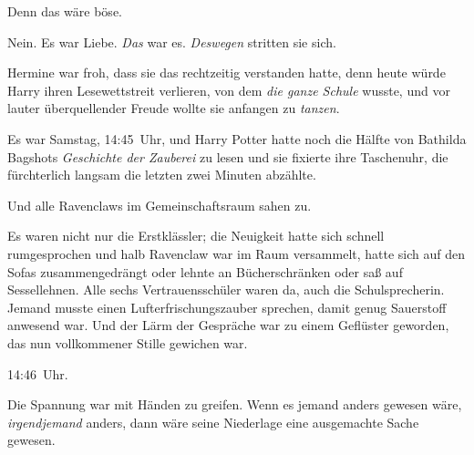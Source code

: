 Denn das wäre böse.

Nein. Es war Liebe. \emph{Das} war es. \emph{Deswegen} stritten sie sich.

Hermine war froh, dass sie das rechtzeitig verstanden hatte, denn heute würde Harry ihren Lesewettstreit verlieren, von dem \emph{die ganze Schule} wusste, und vor lauter überquellender Freude wollte sie anfangen zu \emph{tanzen}.

Es war Samstag, 14:45~Uhr, und Harry Potter hatte noch die Hälfte von Bathilda Bagshots \emph{Geschichte der Zauberei} zu lesen und sie fixierte ihre Taschenuhr, die fürchterlich langsam die letzten zwei Minuten abzählte.

Und alle Ravenclaws im Gemeinschaftsraum sahen zu.

Es waren nicht nur die Erstklässler; die Neuigkeit hatte sich schnell rumgesprochen und halb Ravenclaw war im Raum versammelt, hatte sich auf den Sofas zusammengedrängt oder lehnte an Bücherschränken oder saß auf Sessellehnen. Alle sechs Vertrauensschüler waren da, auch die Schulsprecherin. Jemand musste einen Lufterfrischungszauber sprechen, damit genug Sauerstoff anwesend war. Und der Lärm der Gespräche war zu einem Geflüster geworden, das nun vollkommener Stille gewichen war.

14:46~Uhr.

Die Spannung war mit Händen zu greifen. Wenn es jemand anders gewesen wäre, \emph{irgendjemand} anders, dann wäre seine Niederlage eine ausgemachte Sache gewesen.

